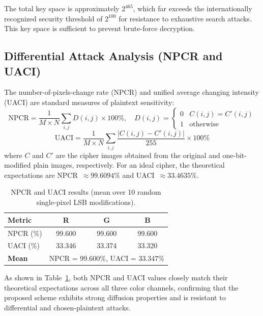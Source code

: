 \documentclass[a4paper,fleqn]{cas-sc}
\theoremstyle{plain}
\theoremstyle{definition}
\begin{document}
The total key space is approximately $2^{465}$, which far exceeds the internationally recognized security threshold of $2^{100}$ for resistance to exhaustive search attacks. This key space is sufficient to prevent brute-force decryption.

\subsection{Differential Attack Analysis (NPCR and UACI)}

The number-of-pixels-change rate (NPCR) and unified average changing intensity (UACI) are standard measures of plaintext sensitivity:
\begin{equation}
	\mathrm{NPCR} = \frac{1}{M \times N} \sum_{i,j} D(i,j) \times 100\%, \quad
	D(i,j) = \begin{cases} 0 & C(i,j) = C'(i,j) \\ 1 & \text{otherwise} \end{cases}
\end{equation}
\begin{equation}
	\mathrm{UACI} = \frac{1}{M \times N} \sum_{i,j} \frac{|C(i,j) - C'(i,j)|}{255} \times 100\%
\end{equation}
where $C$ and $C'$ are the cipher images obtained from the original and one-bit-modified plain images, respectively. For an ideal cipher, the theoretical expectations are NPCR~$\approx 99.6094\%$ and UACI~$\approx 33.4635\%$.

\begin{table}[htbp]
	\centering
	\caption{NPCR and UACI results (mean over 10 random single-pixel LSB modifications).}
	\label{tab:npcr_uaci}
	\begin{tabular}{lccc}
		\toprule
		\textbf{Metric} & \textbf{R} & \textbf{G} & \textbf{B} \\
		\midrule
		NPCR (\%) & 99.600 & 99.600 & 99.600 \\
		UACI (\%) & 33.346 & 33.374 & 33.320 \\
		\midrule
		\textbf{Mean} & \multicolumn{3}{c}{NPCR = 99.600\%, \quad UACI = 33.347\%} \\
		\bottomrule
	\end{tabular}
\end{table}

As shown in Table~\ref{tab:npcr_uaci}, both NPCR and UACI values closely match their theoretical expectations across all three color channels, confirming that the proposed scheme exhibits strong diffusion properties and is resistant to differential and chosen-plaintext attacks.
\end{document}
